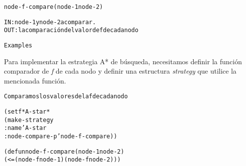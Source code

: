 \begin{aibox}{\function}
\begin{alltt}
node-f-compare (node-1 node-2)


IN:     node-1 y node-2 a comparar.
OUT:    la comparación del valor de f de cada nodo

\end{alltt}
\end{aibox}

\begin{aibox}{\examples}
\begin{alltt}
Examples


\end{alltt}
\end{aibox}

\begin{aibox}{\comments}
Para implementar la estrategia A* de búsqueda, necesitamos definir la función comparador de \textit{f} de cada nodo y definir una estructura \textit{strategy} que utilice la mencionada función.

\end{aibox}

\begin{aibox}{\pseudocode}
\begin{alltt}

    Comparamos los valores de la f de cada nodo

\end{alltt}
\end{aibox}

\begin{aibox}{\code}
\begin{alltt}
(setf *A-star*
    (make-strategy 
        :name 'A-star
        :node-compare-p 'node-f-compare))

(defun node-f-compare (node-1 node-2)
    (<= (node-f node-1) (node-f node-2)))

\end{alltt}
\end{aibox}
